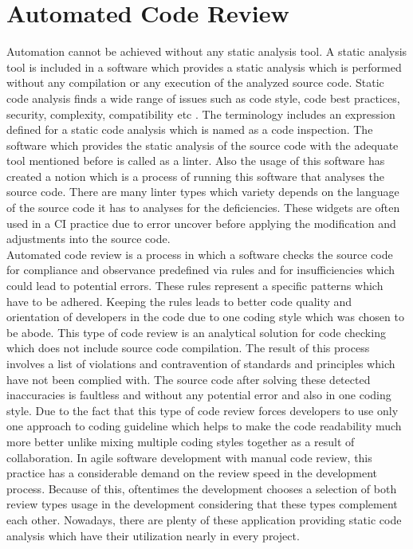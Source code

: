 \section{Automated Code Review}

Automation cannot be achieved without any static analysis tool. A static analysis tool is included in a software which provides a static analysis which is performed without any compilation or any execution of the analyzed source code. Static code analysis finds a wide range of issues such as code style, code best practices, security, complexity, compatibility etc \cite{codacy}. The terminology includes an expression defined for a static code analysis which is named as a code inspection. The software which provides the static analysis of the source code with the adequate tool mentioned before is called as a linter. Also the usage of this software has created a notion  which is a process of running this software that analyses the source code. There are many linter types which variety depends on the language of the source code it has to analyses for the deficiencies. These widgets are often used in a CI practice due to error uncover before applying the modification and adjustments into the source code.\\

Automated code review is a process in which a software checks the source code for compliance and observance predefined via rules and for insufficiencies which could lead to potential errors. These rules represent a specific patterns which have to be adhered. Keeping the rules leads to better code quality and orientation of developers in the code due to one coding style which was chosen to be abode. This type of code review is an analytical solution for code checking which does not include source code compilation. The result of this process involves a list of violations and contravention of standards and principles which have not been complied with. The source code after solving these detected inaccuracies is faultless and without any potential error and also in one coding style. Due to the fact that this type of code review forces developers to use only one approach to coding guideline which helps to make the code readability much more better unlike mixing multiple coding styles together as a result of collaboration. In agile software development with manual code review, this practice has a considerable demand on the review speed in the development process. Because of this, oftentimes the development chooses a selection of both review types usage in the development considering that these types complement each other. Nowadays, there are plenty of these application providing static code analysis which have their utilization nearly in every project.

